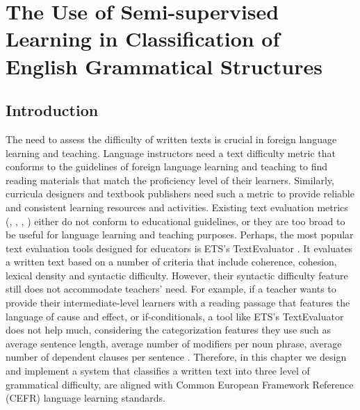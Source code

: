 
\chapter{The Use of Semi-supervised Learning in Classification of English Grammatical Structures} %

\label{Chapter2} %

\section{Introduction}

The need to assess the difficulty of written texts is crucial in foreign language learning and teaching. Language instructors need a text difficulty metric that conforms to the guidelines of foreign language learning and teaching to find reading materials that match the proficiency level of their learners. Similarly, curricula designers and textbook publishers need such a metric to provide reliable and consistent learning resources and activities. Existing text evaluation metrics (\cite{kincaid1975flesch}, \cite{stenner2006accurate}, \cite{landauer2011word}, \cite{graesser2011coh}) either do not conform to educational guidelines, or they are too broad to be useful for language learning and teaching purposes. Perhaps, the most popular text evaluation tools designed for educators is ETS's TextEvaluator \citep{napolitano2015online}. It evaluates a written text based on a number of criteria that include coherence, cohesion, lexical density and syntactic difficulty. However, their syntactic difficulty feature still does not accommodate teachers' need. For example, if a teacher wants to provide their intermediate-level learners with a reading passage that features the language of cause and effect, or if-conditionals, a tool like ETS's TextEvaluator does not help much, considering the categorization features they use such as average sentence length, average number of modifiers per noun phrase, average number of dependent clauses per sentence \citep{ets_txt_eval}. Therefore, in this chapter we design and implement a system that classifies a written text into three level of grammatical difficulty, are aligned with Common European Framework Reference (CEFR) \citep{council2001common} language learning standards. 

